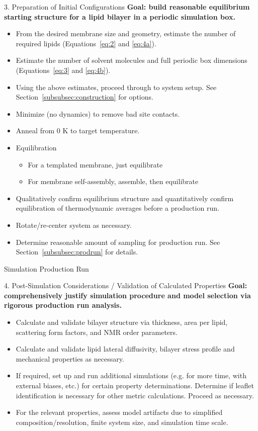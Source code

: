 \documentclass[9pt,bestpractices,pubversion]{livecoms}
\begin{document}
\begin{Checklists*}[p!]
\begin{checklist}{3. Preparation of Initial Configurations}
\textbf{Goal: build reasonable equilibrium starting structure for a lipid bilayer in a periodic simulation box.}
\begin{itemize}
\item From the desired membrane size and geometry, estimate the number of required lipids (Equations~\ref{eq:2} and \ref{eq:4a}).
\item Estimate the number of solvent molecules and full periodic box dimensions (Equations~\ref{eq:3} and \ref{eq:4b}).
\item Using the above estimates, proceed through to system setup. See Section~\ref{subsubsec:construction} for options.
\item Minimize (no dynamics) to remove bad site contacts.
\item Anneal from 0 K to target temperature.
\item Equilibration
	\begin{itemize}
	\item For a templated membrane, just equilibrate
	\item For membrane self-assembly, assemble, then equilibrate
	\end{itemize}
\item Qualitatively confirm equilibrium structure and quantitatively confirm equilibration of thermodynamic averages before a production run.
\item Rotate/re-center system as necessary.
\item Determine reasonable amount of sampling for production run. See Section~\ref{subsubsec:prodrun} for details.
\end{itemize}
\end{checklist}

\begin{checklist}{Simulation Production Run}
\end{checklist}

\begin{checklist}{4. Post-Simulation Considerations / Validation of Calculated Properties}
\textbf{Goal: comprehensively justify simulation procedure and model selection via rigorous production run analysis.}
\begin{itemize}
\item Calculate and validate bilayer structure via thickness, area per lipid, scattering form factors, and NMR order parameters.
\item Calculate and validate lipid lateral diffusivity, bilayer stress profile and mechanical properties as necessary.
\item If required, set up and run additional simulations (e.g. for more time, with external biases, etc.) for certain property determinations. Determine if leaflet identification is necessary for other metric calculations. Proceed as necessary.
\item For the relevant properties, assess model artifacts due to simplified composition/resolution, finite system size, and simulation time scale.
\end{itemize}
\end{checklist}


\end{Checklists*}
\end{document}
